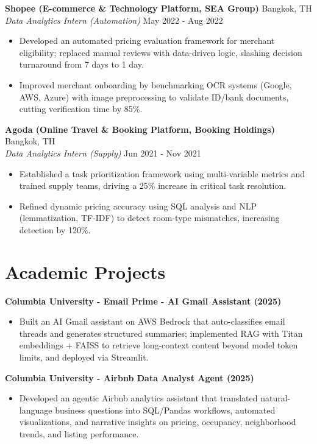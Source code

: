 \documentclass[a4paper,10pt]{article}
\begin{document}
\vspace{6pt}

\noindent \textbf{Shopee (E-commerce \& Technology Platform, SEA Group)} \hfill Bangkok, TH \\
\textit{Data Analytics Intern (Automation)} \hfill May 2022 - Aug 2022
\begin{itemize}
    \item Developed an automated pricing evaluation framework for merchant eligibility; replaced manual reviews with data-driven logic, slashing decision turnaround from 7 days to 1 day.
    \item Improved merchant onboarding by benchmarking OCR systems (Google, AWS, Azure) with image preprocessing to validate ID/bank documents, cutting verification time by 85\%.
\end{itemize}

\vspace{6pt}

\noindent \textbf{Agoda (Online Travel \& Booking Platform, Booking Holdings)} \hfill Bangkok, TH \\
\textit{Data Analytics Intern (Supply)} \hfill Jun 2021 - Nov 2021
\begin{itemize}
    \item Established a task prioritization framework using multi-variable metrics and trained supply teams, driving a 25\% increase in critical task resolution.
    \item Refined dynamic pricing accuracy using SQL analysis and NLP (lemmatization, TF-IDF) to detect room-type mismatches, increasing detection by 120\%.
\end{itemize}

\section{Academic Projects}
\noindent \textbf{Columbia University - Email Prime - AI Gmail Assistant (2025)}
\begin{itemize}
    \item Built an AI Gmail assistant on AWS Bedrock that auto-classifies email threads and generates structured summaries; implemented RAG with Titan embeddings + FAISS to retrieve long-context content beyond model token limits, and deployed via Streamlit.
\end{itemize}

\vspace{6pt}

\noindent \textbf{Columbia University - Airbnb Data Analyst Agent (2025)}
\begin{itemize}
    \item Developed an agentic Airbnb analytics assistant that translated natural-language business questions into SQL/Pandas workflows, automated visualizations, and narrative insights on pricing, occupancy, neighborhood trends, and listing performance.
\end{itemize}
\end{document}
